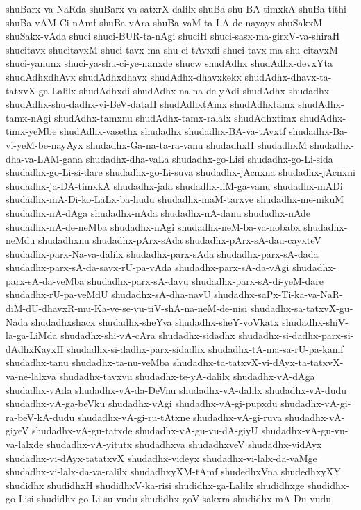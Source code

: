 {shuBarx-va-NaRda
shuBarx-va-satxrX-dalilx
shuBa-shu-BA-timxkA
shuBa-tithi
shuBa-vAM-Ci-nAmf
shuBa-vAra
shuBa-vaM-ta-LA-de-nayayx
shuSakxM
shuSakx-vAda
shuci
shuci-BUR-ta-nAgi
shuciH
shuci-sasx-ma-girxV-va-shiraH
shucitavx
shucitavxM
shuci-tavx-ma-shu-ci-tAvxdi
shuci-tavx-ma-shu-citavxM
shuci-yanunx
shuci-ya-shu-ci-ye-nanxde
shucw
shudAdhx
shudAdhx-devxYta
shudAdhxdhAvx
shudAdhxdhavx
shudAdhx-dhavxkekx
shudAdhx-dhavx-ta-tatxvX-ga-Lalilx
shudAdhxdi
shudAdhx-na-na-de-yAdi
shudAdhx-shudadhx
shudAdhx-shu-dadhx-vi-BeV-dataH
shudAdhxtAmx
shudAdhxtamx
shudAdhx-tamx-nAgi
shudAdhx-tamxnu
shudAdhx-tamx-ralalx
shudAdhxtimx
shudAdhx-timx-yeMbe
shudAdhx-vasethx
shudadhx
shudadhx-BA-va-tAvxtf
shudadhx-Ba-vi-yeM-be-nayAyx
shudadhx-Ga-na-ta-ra-vanu
shudadhxH
shudadhxM
shudadhx-dha-va-LAM-gana
shudadhx-dha-vaLa
shudadhx-go-Lisi
shudadhx-go-Li-sida
shudadhx-go-Li-si-dare
shudadhx-go-Li-suva
shudadhx-jAcnxna
shudadhx-jAcnxni
shudadhx-ja-DA-timxkA
shudadhx-jala
shudadhx-liM-ga-vanu
shudadhx-mADi
shudadhx-mA-Di-ko-LaLx-ba-hudu
shudadhx-maM-tarxve
shudadhx-me-nikuM
shudadhx-nA-dAga
shudadhx-nAda
shudadhx-nA-danu
shudadhx-nAde
shudadhx-nA-de-neMba
shudadhx-nAgi
shudadhx-neM-ba-va-nobabx
shudadhx-neMdu
shudadhxnu
shudadhx-pArx-sAda
shudadhx-pArx-sA-dau-cayxteV
shudadhx-parx-Na-va-dalilx
shudadhx-parx-sAda
shudadhx-parx-sA-dada
shudadhx-parx-sA-da-savx-rU-pa-vAda
shudadhx-parx-sA-da-vAgi
shudadhx-parx-sA-da-veMba
shudadhx-parx-sA-davu
shudadhx-parx-sA-di-yeM-dare
shudadhx-rU-pa-veMdU
shudadhx-sA-dha-navU
shudadhx-saPx-Ti-ka-va-NaR-diM-dU-dhavxR-mu-Ka-ve-se-vu-tiV-shA-na-neM-de-nisi
shudadhx-sa-tatxvX-gu-Nada
shudadhxshacx
shudadhx-sheYva
shudadhx-sheY-voVkatx
shudadhx-shiV-la-ga-LiMda
shudadhx-shi-vA-cAra
shudadhx-sidadhx
shudadhx-si-dadhx-parx-si-dAdhxKayxH
shudadhx-si-dadhx-parx-sidadhx
shudadhx-tA-ma-sa-rU-pa-kamf
shudadhx-tanu
shudadhx-ta-nu-veMba
shudadhx-ta-tatxvX-vi-dAyx-ta-tatxvX-va-ne-lalxva
shudadhx-tavxvu
shudadhx-te-yA-dalilx
shudadhx-vA-dAga
shudadhx-vAda
shudadhx-vA-da-DeVnu
shudadhx-vA-dalilx
shudadhx-vA-dudu
shudadhx-vA-ga-beVku
shudadhx-vAgi
shudadhx-vA-gi-pupxdu
shudadhx-vA-gi-ra-beV-kA-dudu
shudadhx-vA-gi-ru-tAtxne
shudadhx-vA-gi-ruva
shudadhx-vA-giyeV
shudadhx-vA-gu-tatxde
shudadhx-vA-gu-vu-dA-giyU
shudadhx-vA-gu-vu-va-lalxde
shudadhx-vA-yitutx
shudadhxva
shudadhxveV
shudadhx-vidAyx
shudadhx-vi-dAyx-tatatxvX
shudadhx-videyx
shudadhx-vi-lalx-da-vaMge
shudadhx-vi-lalx-da-va-ralilx
shudadhxyXM-tAmf
shudedhxVna
shudedhxyXY
shudidhx
shudidhxH
shudidhxV-ka-risi
shudidhx-ga-Lalilx
shudidhxge
shudidhx-go-Lisi
shudidhx-go-Li-su-vudu
shudidhx-goV-sakxra
shudidhx-mA-Du-vudu
}
